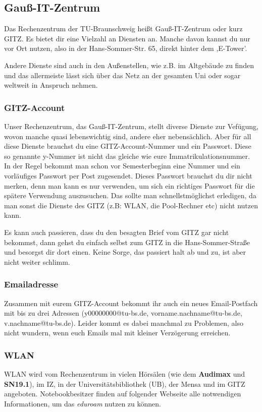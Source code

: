 \subsection{Gauß-IT-Zentrum}

	Das Rechenzentrum der TU-Braunschweig heißt Gauß-IT-Zentrum oder kurz GITZ. Es bietet dir eine Vielzahl an Diensten an. Manche davon kannst du nur vor Ort nutzen, also in der Hans-Sommer-Str. 65, direkt hinter dem ,E-Tower'. 
	
	Andere Dienste sind auch in den Außenstellen, wie z.B. im
	Altgebäude zu finden und das allermeiste lässt sich über das Netz an der gesamten Uni oder sogar weltweit in Anspruch nehmen.

\subsubsection{GITZ-Account}
\label{todogitz}
	Unser Rechenzentrum, das Gauß-IT-Zentrum, stellt  diverse Dienste zur Vefügung, wovon manche quasi lebenswichtig sind, andere eher nebensächlich. Aber für all diese Dienste brauchst du eine GITZ-Account-Nummer und ein Passwort. Diese so genannte y-Nummer ist nicht das gleiche wie eure Immatrikulationsnummer. In der Regel bekommt man schon vor Semesterbeginn eine Nummer und ein vorläufiges Passwort per Post zugesendet. Dieses Passwort brauchst du dir nicht merken, denn man kann es nur verwenden, um  sich ein richtiges Passwort für die spätere Verwendung auszusuchen. Das sollte man schnellstmöglichst erledigen, da man sonst die Dienste des GITZ (z.B: WLAN, die Pool-Rechner etc) nicht nutzen kann. 
	
	Es kann auch passieren, dass du den besagten Brief vom GITZ  gar nicht bekommst, dann gehst du einfach selbst zum GITZ in die Hans-Sommer-Straße und besorgst dir dort einen. Keine Sorge, das passiert halt ab und zu, ist aber nicht weiter schlimm.

	\subsubsection{Emailadresse}
		Zusammen mit eurem GITZ-Account bekommt ihr auch ein neues Email-Postfach mit bis zu drei Adressen (y00000000@tu-bs.de, vorname.nachname@tu-bs.de, v.nachname@tu-bs.de). Leider kommt es dabei manchmal zu Problemen, also nicht wundern, wenn euch Emails mal mit kleiner Verzögerung erreichen. 

	\subsubsection{WLAN}
		\label{wlan}
		WLAN wird vom Rechenzentrum in vielen Hörsälen (wie dem \textbf{Audimax} und \textbf{SN19.1}), im IZ, in der Universitätsbibliothek (UB), der Mensa und im GITZ angeboten. Notebookbesitzer finden auf folgender Webseite alle notwendigen Informationen, um das \emph{eduroam} nutzen zu können. 

